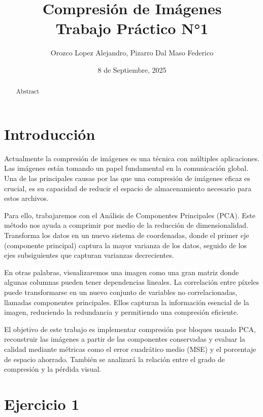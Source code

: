 \documentclass[12pt, a4paper]{article}
\title {Compresión de Imágenes \\[1ex] \large Trabajo Práctico N°1}
\author{Orozco Lopez Alejandro, Pizarro Dal Maso Federico}
\date{8 de Septiembre, 2025}
\begin{document}
\setlength{\parskip}{1em}

\captionsetup[table]{name=Tabla}

\maketitle

\begin{abstract}
    
Abstract

\end{abstract}

\section*{Introducción}

Actualmente la compresión de imágenes es una técnica con múltiples aplicaciones. 
Las imágenes están tomando un papel fundamental en la comunicación global. 
Una de las principales causas por las que una compresión de imágenes eficaz es crucial, es su capacidad de reducir el espacio de almacenamiento necesario para estos archivos.

Para ello, trabajaremos con el Análisis de Componentes Principales (PCA). 
Este método nos ayuda a comprimir por medio de la reducción de dimensionalidad.
Transforma los datos en un nuevo sistema de coordenadas, donde el primer eje (componente principal) captura la mayor varianza de los datos, seguido de los ejes subsiguientes que capturan varianzas decrecientes.

En otras palabras, visualizaremos una imagen como una gran matriz donde algunas columnas pueden tener dependencias lineales. 
La correlación entre píxeles puede transformarse en un nuevo conjunto de variables no correlacionadas, llamadas componentes principales. 
Ellos capturan la información esencial de la imagen, reduciendo la redundancia y permitiendo una compresión eficiente.

El objetivo de este trabajo es implementar compresión por bloques usando PCA, reconstruir las imágenes a partir de las componentes conservadas y evaluar la calidad mediante métricas como el error cuadrático medio (MSE) y el porcentaje de espacio ahorrado. 
También se analizará la relación entre el grado de compresión y la pérdida visual.

\section*{Ejercicio 1}
\end{document}
